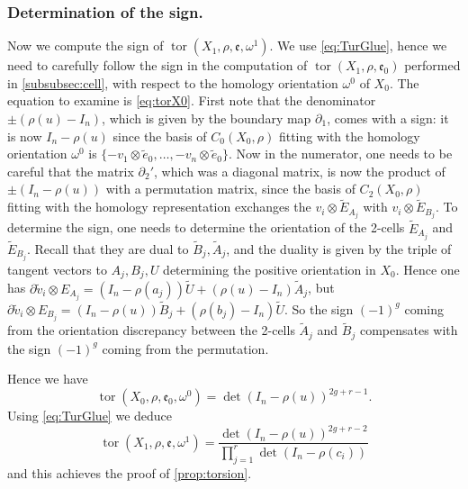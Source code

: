 \documentclass[10pt]{amsart}
\theoremstyle{plain}
\theoremstyle{definition}
\theoremstyle{remark}
\numberwithin{equation}{section}
\DeclareMathOperator{\tor}{tor}
\begin{document}
\subsubsection*{Determination of the sign.}
Now we compute the sign of $\tor(X_1, \rho, \mathfrak e, \omega^1)$. We use \cref{eq:TurGlue}, hence we need to carefully follow the sign in the computation of $\tor(X_1, \rho, \mathfrak e_0)$ performed in \cref{subsubsec:cell}, with respect to the homology orientation $\omega^0$ of $X_0$. The equation to examine is \cref{eq:torX0}.
First note that the denominator $\pm (\rho(u) - I_n)$, which is given by the boundary map $\partial_1$, comes with a sign: it is now $I_n - \rho(u)$ since the basis of $C_0(X_0, \rho)$ fitting with the homology orientation $\omega^0$ is
$\{ -v_1 \otimes \widetilde e_0, \ldots, - v_n \otimes \widetilde e_0 \}$. Now in the numerator, one needs to be careful that the matrix $\partial_2'$, which was a diagonal matrix, is now the product of $\pm(I_n - \rho(u))$ with a permutation matrix, since the basis of $C_2(X_0, \rho)$ fitting with the homology representation exchanges the $v_i \otimes \widetilde E_{A_j}$ with $v_i \otimes \widetilde E_{B_j}$.
To determine the sign, one needs to determine the orientation of the 2-cells $\widetilde E_{A_j}$ and $\widetilde E_{B_j}$. Recall that they are dual to $\widetilde B_j, \widetilde A_j$, and the duality is given by the triple of tangent vectors to $A_j, B_j, U$ determining the positive orientation in $X_0$. Hence one has $\partial \widetilde v_i \otimes E_{A_j} = (I_n - \rho(a_j)) \widetilde U + (\rho(u) - I_n) \widetilde A_j$, but
$\partial \widetilde v_i \otimes E_{B_j} = (I_n - \rho(u)) \widetilde B_j + (\rho(b_j) - I_n) \widetilde U$.
So the sign $(-1)^g$ coming from the orientation discrepancy between the 2-cells $\widetilde A_j$ and $\widetilde B_j$ compensates with the sign $(-1)^g$ coming from the permutation.

Hence we have
\[
\tor(X_0, \rho, \mathfrak e_0, \omega^0) =\det(I_n - \rho(u))^{2g+r-1}.
\]
Using \cref{eq:TurGlue} we deduce
\begin{equation}
\label{eq:signTor}
\tor(X_1, \rho, \mathfrak e, \omega^1) = \frac{\det(I_n - \rho(u))^{2g+r-2}}{\prod_{j=1}^r \det(I_n-\rho(c_i))}
\end{equation}
and this achieves the proof of \cref{prop:torsion}.
\end{document}
